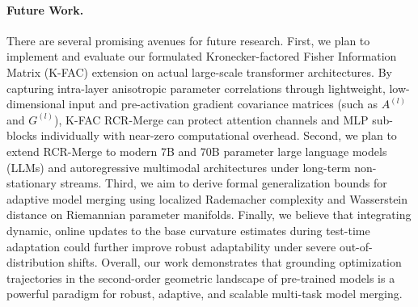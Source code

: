 \paragraph{Future Work.}
There are several promising avenues for future research. First, we plan to implement and evaluate our formulated Kronecker-factored Fisher Information Matrix (K-FAC) extension on actual large-scale transformer architectures. By capturing intra-layer anisotropic parameter correlations through lightweight, low-dimensional input and pre-activation gradient covariance matrices (such as $A^{(l)}$ and $G^{(l)}$), K-FAC RCR-Merge can protect attention channels and MLP sub-blocks individually with near-zero computational overhead. Second, we plan to extend RCR-Merge to modern 7B and 70B parameter large language models (LLMs) and autoregressive multimodal architectures under long-term non-stationary streams. Third, we aim to derive formal generalization bounds for adaptive model merging using localized Rademacher complexity and Wasserstein distance on Riemannian parameter manifolds. Finally, we believe that integrating dynamic, online updates to the base curvature estimates during test-time adaptation could further improve robust adaptability under severe out-of-distribution shifts. Overall, our work demonstrates that grounding optimization trajectories in the second-order geometric landscape of pre-trained models is a powerful paradigm for robust, adaptive, and scalable multi-task model merging.